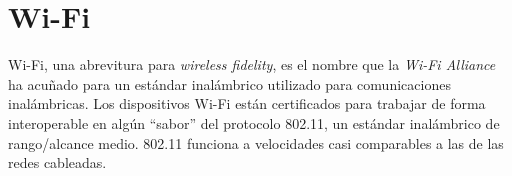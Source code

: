 \documentclass[10pt,journal,compsoc]{IEEEtran}
\begin{document}




% 
% 
% 
% 


\section{Wi-Fi}
Wi-Fi, una abrevitura para \emph{wireless fidelity}, es el nombre que la \emph{Wi-Fi Alliance} ha acuñado para un estándar inalámbrico utilizado para comunicaciones inalámbricas. Los dispositivos Wi-Fi están certificados para trabajar de forma interoperable en algún ``sabor'' del protocolo 802.11, un estándar inalámbrico de rango/alcance medio. 802.11 funciona a velocidades casi comparables a las de las redes cableadas.
\end{document}
